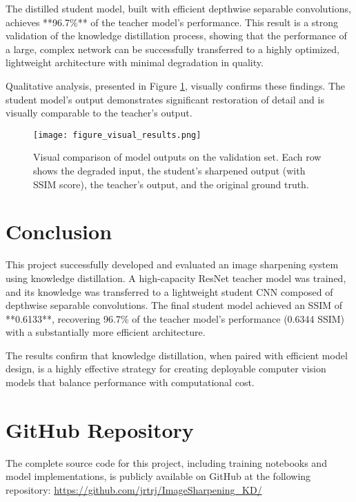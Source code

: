 \documentclass[12pt,a4paper]{article}
\begin{document}
The distilled student model, built with efficient depthwise separable convolutions, achieves **96.7\%** of the teacher model's performance. This result is a strong validation of the knowledge distillation process, showing that the performance of a large, complex network can be successfully transferred to a highly optimized, lightweight architecture with minimal degradation in quality.

Qualitative analysis, presented in Figure \ref{fig:visual_results}, visually confirms these findings. The student model's output demonstrates significant restoration of detail and is visually comparable to the teacher's output.

\begin{figure}[htbp]
    \centering
    \texttt{[image: figure\_visual\_results.png]}
    \caption{Visual comparison of model outputs on the validation set. Each row shows the degraded input, the student's sharpened output (with SSIM score), the teacher's output, and the original ground truth.}
    \label{fig:visual_results}
\end{figure}

\newpage
\section{Conclusion}
This project successfully developed and evaluated an image sharpening system using knowledge distillation. A high-capacity ResNet teacher model was trained, and its knowledge was transferred to a lightweight student CNN composed of depthwise separable convolutions. The final student model achieved an SSIM of **0.6133**, recovering 96.7\% of the teacher model's performance (0.6344 SSIM) with a substantially more efficient architecture.

The results confirm that knowledge distillation, when paired with efficient model design, is a highly effective strategy for creating deployable computer vision models that balance performance with computational cost.

\newpage
\section*{GitHub Repository}
The complete source code for this project, including training notebooks and model implementations, is publicly available on GitHub at the following repository:
\url{https://github.com/jrtrj/ImageSharpening_KD/}
\end{document}
